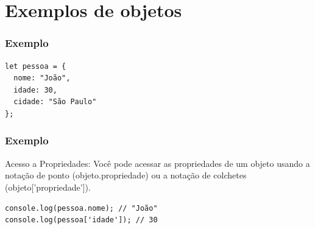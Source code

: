 \documentclass[13pt, xcolor={dvipsnames,svgnames}, portuguese]{beamer}
\begin{document}
\section{Exemplos de objetos}

\begin{frame}[fragile]
\frametitle{Exemplo}
\begin{verbatim}
let pessoa = {
  nome: "João",
  idade: 30,
  cidade: "São Paulo"
};

\end{verbatim}
\end{frame}


\begin{frame}[fragile]
\frametitle{Exemplo}
Acesso a Propriedades: Você pode acessar as propriedades de um objeto usando a notação de ponto (objeto.propriedade) ou a notação de colchetes (objeto['propriedade']).
\begin{verbatim}
console.log(pessoa.nome); // "João"
console.log(pessoa['idade']); // 30
\end{verbatim}
\end{frame}








\end{document}
